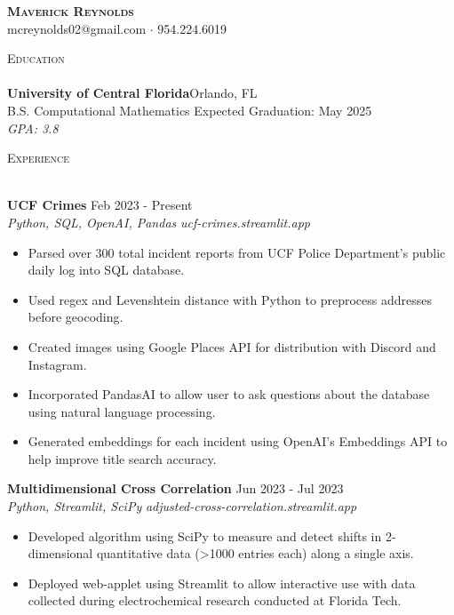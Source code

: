 \documentclass[letterpaper]{article}
\newcommand{\lineunder} {
    \vspace*{-8pt} \\
    \hspace*{-18pt} \hrulefill \\
}
\newcommand{\header} [1] {
    {\hspace*{-18pt}\vspace*{12pt} \large\textsc{#1}}
    \vspace*{-12pt} \lineunder
}
\begin{document}
\vspace*{-25pt}
    

\vspace*{-10pt}
\begin{center}
	{\Huge \scshape \textbf {Maverick Reynolds}}\\
	mcreynolds02@gmail.com $\cdot$ 954.224.6019\\
\end{center}


\header{Education}
\textbf{University of Central Florida}\hfill Orlando, FL\\
B.S. Computational Mathematics \hfill Expected Graduation: May 2025\\
\hspace{7mm} \textit{GPA: 3.8}\\
\vspace{3mm}


\header{Experience}
\vspace{1mm}

\textbf{UCF Crimes} \hfill Feb 2023 - Present \\
\textit{Python, SQL, OpenAI, Pandas} \hfill \textit{ucf-crimes.streamlit.app}\\
\vspace{-1mm}
\begin{itemize} \itemsep 1pt
	\item Parsed over 300 total incident reports from UCF Police Department's public daily log into SQL database.
	\item Used regex and Levenshtein distance with Python to preprocess addresses before geocoding.
	\item Created images using Google Places API for distribution with Discord and Instagram.
	\item Incorporated PandasAI to allow user to ask questions about the database using natural language processing.
	\item Generated embeddings for each incident using OpenAI's Embeddings API to help improve title search accuracy.
\end{itemize}

\textbf{Multidimensional Cross Correlation} \hfill Jun 2023 - Jul 2023 \\
\textit{Python, Streamlit, SciPy} \hfill \textit{adjusted-cross-correlation.streamlit.app}\\
\vspace{-1mm}
\begin{itemize} \itemsep 1pt
	\item Developed algorithm using SciPy to measure and detect shifts in 2-dimensional quantitative data (>1000 entries each) along a single axis.
	\item Deployed web-applet using Streamlit to allow interactive use with data collected during electrochemical research conducted at Florida Tech.
\end{itemize}
\end{document}
